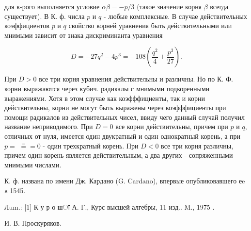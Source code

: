 \documentclass[10pt]{article}
\begin{document}
для к-рого выполняется условие $\alpha \beta=-p / 3$ (такое значение корня $\beta$ всегда существует). В К. ф. числа $p$ и $q$ - любые комплексные. В случае действительных коэффициентов $p$ и $q$ свойство корней уравнения быть действительными или мнимыми зависит от знака дискриминанта уравнения



\[

D=-27 q^{2}-4 p^{3}=-108\left(\frac{q^{2}}{4}+\frac{p^{3}}{27}\right) .

\]



При $D>0$ все три корня уравнения действительны и различны. Но по К. Ф. корни выражаются через кубич. радикалы с мнимыми подкоренными выражениями. Хотя в этом случае как коэфффициенты, так и корни действительны, корни не могут быть выражены через коэфффициенты при помощи радикалов из действительных чисел, ввиду чего данный случай получил название неприводимого. При $D=0$ все корни действительны, причем при $p$ и $q$, отличных от нуля, имеется один двукратный и один однократный корень, а при $p=$ $\stackrel{=}{=}=0$ - один трехкратный корень. При $D<0$ все три корня различны, причем один корень является действительным, а два других - сопряженными мнимыми числами.



К. ф. названа по имени Дж. Кардано (G. Cardano), впервые опубликовавшего еe в 1545.



Лum.: [1] К у р о шा А. Г., Курс высшей алгебры, 11 изд.. M., 1975 .



И. В. Проскуряков.
\end{document}
